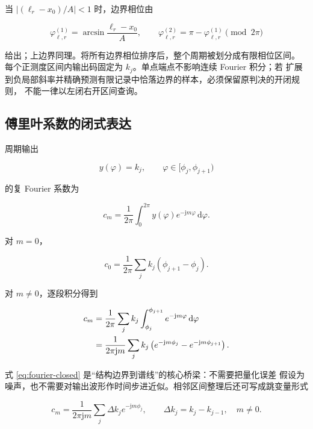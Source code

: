 \documentclass[11pt,a4paper]{ctexart}
\newcommand{\dd}{\,\mathrm{d}}
\newcommand{\jj}{\mathrm{j}}
\theoremstyle{adcplain}
\theoremstyle{definition}
\begin{document}
当 $|(\ell_r-x_0)/A|<1$ 时，边界相位由

\begin{equation}
  \varphi_{\ell,r}^{(1)}
  =\arcsin\frac{\ell_r-x_0}{A},
  \qquad
  \varphi_{\ell,r}^{(2)}
  =\pi-\varphi_{\ell,r}^{(1)}
  \pmod{2\pi}
\end{equation}

给出；上边界同理。将所有边界相位排序后，整个周期被划分成有限相位区间。
每个正测度区间内输出码固定为 $k_j$。单点端点不影响连续 Fourier 积分；若
扩展到负局部斜率并精确预测有限记录中恰落边界的样本，必须保留原判决的开闭规则，
不能一律以左闭右开区间查询。

\subsection{傅里叶系数的闭式表达}

周期输出

\begin{equation}
  y(\varphi)=k_j,\qquad
  \varphi\in[\phi_j,\phi_{j+1})
\end{equation}

的复 Fourier 系数为

\begin{equation}
  c_m
  =
  \frac{1}{2\pi}
  \int_0^{2\pi}y(\varphi)e^{-\jj m\varphi}\dd\varphi.
  \label{eq:fourier-definition}
\end{equation}

对 $m=0$，

\begin{equation}
  c_0
  =
  \frac{1}{2\pi}
  \sum_j k_j(\phi_{j+1}-\phi_j).
  \label{eq:dc-closed}
\end{equation}

对 $m\ne0$，逐段积分得到

\begin{align}
  c_m
  &=
  \frac{1}{2\pi}
  \sum_j
  k_j
  \int_{\phi_j}^{\phi_{j+1}}
  e^{-\jj m\varphi}\dd\varphi \notag\\
  &=
  \frac{1}{2\pi\jj m}
  \sum_j
  k_j
  \left(
    e^{-\jj m\phi_j}
    -
    e^{-\jj m\phi_{j+1}}
  \right). \label{eq:fourier-closed}
\end{align}

式 \eqref{eq:fourier-closed} 是“结构边界到谱线”的核心桥梁：不需要把量化误差
假设为噪声，也不需要对输出波形作时间步进近似。相邻区间整理后还可写成跳变量形式

\begin{equation}
  c_m
  =
  \frac{1}{2\pi\jj m}
  \sum_j
  \Delta k_j e^{-\jj m\phi_j},
  \qquad
  \Delta k_j=k_j-k_{j-1},
  \quad m\ne0.
  \label{eq:jump-spectrum}
\end{equation}
\end{document}
